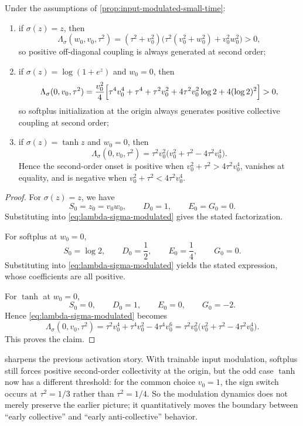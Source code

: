 \begin{corollary}
\label{cor:modulated-activation-examples}
Under the assumptions of \cref{prop:input-modulated-small-time}:
\begin{enumerate}[leftmargin=2em]
  \item if $\sigma(z)=z$, then
  \[
    \Lambda_\sigma(w_0,v_0,\tau^2)
    =
    (\tau^2+v_0^2)\bigl(\tau^2(v_0^2+w_0^2)+v_0^2w_0^2\bigr)>0,
  \]
  so positive off-diagonal coupling is always generated at second order;
  \item if $\sigma(z)=\log(1+e^z)$ and $w_0=0$, then
  \[
    \Lambda_\sigma(0,v_0,\tau^2)
    =
    \frac{v_0^2}{4}
    \Bigl[
      \tau^4v_0^4+\tau^4+\tau^2v_0^2+4\tau^2v_0^2\log 2+4(\log 2)^2
    \Bigr]
    >0,
  \]
  so softplus initialization at the origin always generates positive collective coupling at second order;
  \item if $\sigma(z)=\tanh z$ and $w_0=0$, then
  \[
    \Lambda_\sigma(0,v_0,\tau^2)
    =
    \tau^2v_0^2\bigl(v_0^2+\tau^2-4\tau^2v_0^4\bigr).
  \]
  Hence the second-order onset is positive when $v_0^2+\tau^2>4\tau^2v_0^4$, vanishes at equality, and is negative when $v_0^2+\tau^2<4\tau^2v_0^4$.
\end{enumerate}
\end{corollary}

\begin{proof}
For $\sigma(z)=z$, we have
\[
  S_0=z_0=v_0w_0,
  \qquad
  D_0=1,
  \qquad
  E_0=G_0=0.
\]
Substituting into \eqref{eq:lambda-sigma-modulated} gives the stated factorization.

For softplus at $w_0=0$,
\[
  S_0=\log 2,
  \qquad
  D_0=\frac12,
  \qquad
  E_0=\frac14,
  \qquad
  G_0=0.
\]
Substituting into \eqref{eq:lambda-sigma-modulated} yields the stated expression, whose coefficients are all positive.

For $\tanh$ at $w_0=0$,
\[
  S_0=0,
  \qquad
  D_0=1,
  \qquad
  E_0=0,
  \qquad
  G_0=-2.
\]
Hence \eqref{eq:lambda-sigma-modulated} becomes
\[
  \Lambda_\sigma(0,v_0,\tau^2)
  =
  \tau^2v_0^4+\tau^4v_0^2-4\tau^4v_0^6
  =
  \tau^2v_0^2\bigl(v_0^2+\tau^2-4\tau^2v_0^4\bigr).
\]
This proves the claim.
\end{proof}

\begin{remark}
 sharpens the previous activation story.
With trainable input modulation, softplus still forces positive second-order collectivity at the origin,
but the odd case $\tanh$ now has a different threshold:
for the common choice $v_0=1$, the sign switch occurs at $\tau^2=1/3$ rather than $\tau^2=1/4$.
So the modulation dynamics does not merely preserve the earlier picture; it quantitatively moves the boundary between ``early collective'' and ``early anti-collective'' behavior.
\end{remark}

